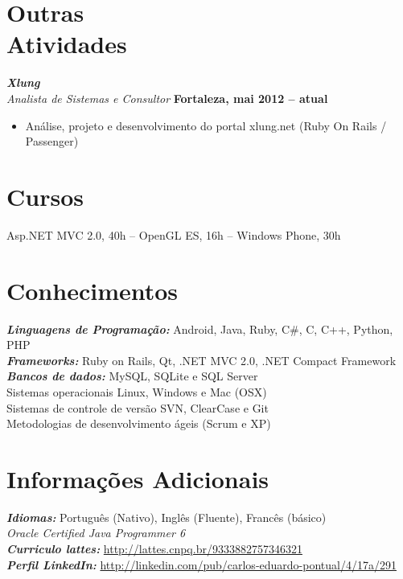 \documentclass[margin, 10pt]{res} %
\begin{document}
\begin{resume}

\section{Outras \\ Atividades}

{\sl\bf Xlung} \\
{\sl Analista de Sistemas e Consultor} \hfill {\bf Fortaleza, mai 2012 -- atual}
\begin{itemize} \itemsep -2pt 
\item Análise, projeto e desenvolvimento do portal xlung.net (Ruby On Rails / Passenger)
\end{itemize} 

\section{Cursos}
Asp.NET MVC 2.0, 40h -- OpenGL ES, 16h -- Windows Phone, 30h


\section{Conhecimentos}
{\sl\bf Linguagens de Programação:}  Android, Java, Ruby, C\#, C, C++, Python, PHP \\
{\sl\bf Frameworks:} Ruby on Rails, Qt, .NET MVC 2.0, .NET Compact Framework \\
{\sl\bf Bancos de dados:} MySQL, SQLite e SQL Server \\
Sistemas operacionais Linux, Windows e Mac (OSX) \\
Sistemas de controle de versão SVN, ClearCase e Git \\
Metodologias de desenvolvimento ágeis (Scrum e XP)  \\

\section {Informações Adicionais}
{\sl\bf Idiomas:} Português (Nativo), Inglês (Fluente), Francês (básico) \\
{\sl Oracle Certified Java Programmer 6} \\
{\sl\bf Curriculo lattes:} \url{http://lattes.cnpq.br/9333882757346321} \\
{\sl\bf Perfil LinkedIn:} \url{http://linkedin.com/pub/carlos-eduardo-pontual/4/17a/291} \\


\end{resume}
\end{document}
